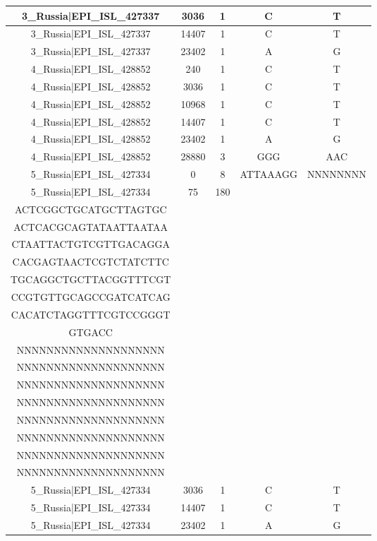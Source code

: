 \documentclass[a4paper,10pt]{article}
\begin{document}
\begin{longtable}{@{}ccccc@{}}
3\_Russia|EPI\_ISL\_427337 & 3036 & 1 & C & T \\* \midrule
3\_Russia|EPI\_ISL\_427337 & 14407 & 1 & C & T \\* \midrule
3\_Russia|EPI\_ISL\_427337 & 23402 & 1 & A & G \\* \midrule
4\_Russia|EPI\_ISL\_428852 & 240 & 1 & C & T \\* \midrule
4\_Russia|EPI\_ISL\_428852 & 3036 & 1 & C & T \\* \midrule
4\_Russia|EPI\_ISL\_428852 & 10968 & 1 & C & T \\* \midrule
4\_Russia|EPI\_ISL\_428852 & 14407 & 1 & C & T \\* \midrule
4\_Russia|EPI\_ISL\_428852 & 23402 & 1 & A & G \\* \midrule
4\_Russia|EPI\_ISL\_428852 & 28880 & 3 & GGG & AAC \\* \midrule
5\_Russia|EPI\_ISL\_427334 & 0 & 8 & ATTAAAGG & NNNNNNNN \\* \midrule
5\_Russia|EPI\_ISL\_427334 & 75 & 180 & \begin{tabular}[c]{@{}c@{}}TTTAAAATCTGTGTGGCTGTC\\ ACTCGGCTGCATGCTTAGTGC\\ ACTCACGCAGTATAATTAATAA\\ CTAATTACTGTCGTTGACAGGA\\ CACGAGTAACTCGTCTATCTTC\\ TGCAGGCTGCTTACGGTTTCGT\\ CCGTGTTGCAGCCGATCATCAG\\ CACATCTAGGTTTCGTCCGGGT\\ GTGACC\end{tabular} & \begin{tabular}[c]{@{}c@{}}NNNNNNNNNNNNNNNNNNNN\\ NNNNNNNNNNNNNNNNNNNN\\ NNNNNNNNNNNNNNNNNNNN\\ NNNNNNNNNNNNNNNNNNNN\\ NNNNNNNNNNNNNNNNNNNN\\ NNNNNNNNNNNNNNNNNNNN\\ NNNNNNNNNNNNNNNNNNNN\\ NNNNNNNNNNNNNNNNNNNN\\ NNNNNNNNNNNNNNNNNNNN\end{tabular} \\* \midrule
5\_Russia|EPI\_ISL\_427334 & 3036 & 1 & C & T \\* \midrule
5\_Russia|EPI\_ISL\_427334 & 14407 & 1 & C & T \\* \midrule
5\_Russia|EPI\_ISL\_427334 & 23402 & 1 & A & G \\* \midrule

\end{longtable}
\end{document}
